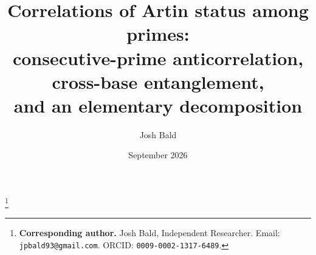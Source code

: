 \documentclass[11pt,reqno]{amsart}
\theoremstyle{plain}
\theoremstyle{definition}
\begin{document}
\title[Correlations of Artin status among primes]{Correlations of Artin status among primes:\\ consecutive-prime anticorrelation, cross-base entanglement,\\ and an elementary decomposition}

\author{Josh Bald}
\address{Ontario, Canada}
\thanks{\textbf{Corresponding author.} Josh Bald, Independent Researcher.
	Email: \texttt{jpbald93@gmail.com}. ORCID: \texttt{0009-0002-1317-6489}.}


\date{September 2026}
\end{document}
